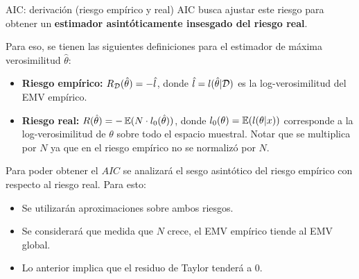 \documentclass[handout, 9pt]{beamer}
\begin{document}
\begin{frame}{AIC: derivación (riesgo empírico y real)}
	AIC busca ajustar este riesgo para obtener un \textbf{estimador asintóticamente insesgado del riesgo real}.\\ \pause
	
Para eso, se tienen las siguientes definiciones para el estimador de máxima verosimilitud $\hat{\theta}$:

\begin{itemize}
	\item \textbf{Riesgo empírico:} $R_{\mathcal D}(\hat{\theta})=-\hat{l}$, donde $\hat{l}=l(\hat{\theta}|{\mathcal D})$ es la log-verosimilitud del EMV empírico. \pause
	\item \textbf{Riesgo real:} $R(\hat{\theta})=-\operatorname{\mathbb{E}}(N\cdot l_0(\hat{\theta}))$, donde $l_0(\theta)=\operatorname{\mathbb{E}}(l(\theta|x))$ corresponde a la log-verosimilitud de $\theta$ sobre todo el espacio muestral. Notar que se multiplica por $N$ ya que en el riesgo empírico no se normalizó por $N$. \pause
\end{itemize}

Para poder obtener el $AIC$ se analizará el sesgo asintótico del riesgo empírico con respecto al riesgo real. Para esto:

\begin{itemize}
	\item Se utilizarán aproximaciones sobre ambos riesgos. \pause
	\item Se considerará que medida que $N$ crece, el EMV empírico tiende al EMV global. \pause
	\item Lo anterior implica que el residuo de Taylor tenderá a 0.
\end{itemize}

\end{frame}
\end{document}
